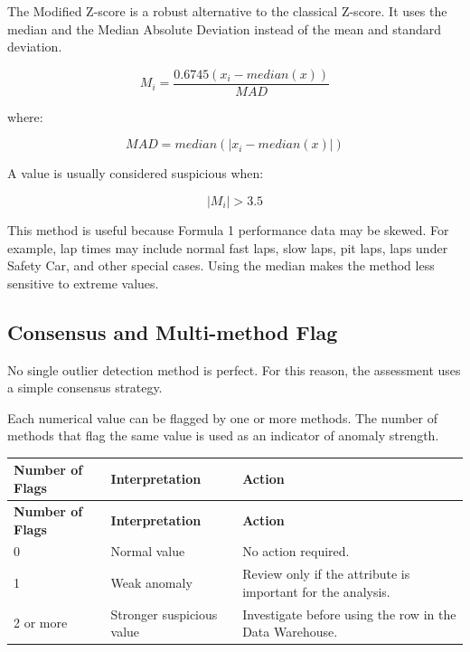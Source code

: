 \documentclass[a4paper,11pt]{article}
\begin{document}
	The Modified Z-score is a robust alternative to the classical Z-score. It uses the median
	and the Median Absolute Deviation instead of the mean and standard deviation.
	
	\[
	M_i = \frac{0.6745(x_i - median(x))}{MAD}
	\]
	
	where:
	
	\[
	MAD = median(|x_i - median(x)|)
	\]
	
	A value is usually considered suspicious when:
	
	\[
	|M_i| > 3.5
	\]
	
	This method is useful because Formula 1 performance data may be skewed. For example,
	lap times may include normal fast laps, slow laps, pit laps, laps under Safety Car, and
	other special cases. Using the median makes the method less sensitive to extreme values.
	
	\subsection{Consensus and Multi-method Flag}
	
	No single outlier detection method is perfect. For this reason, the assessment uses a
	simple consensus strategy.
	
	Each numerical value can be flagged by one or more methods. The number of methods
	that flag the same value is used as an indicator of anomaly strength.
	
	\begin{longtable}{p{3cm}p{5cm}p{6cm}}
		\toprule
		\textbf{Number of Flags} & \textbf{Interpretation} & \textbf{Action} \\
		\midrule
		\endfirsthead
		
		\toprule
		\textbf{Number of Flags} & \textbf{Interpretation} & \textbf{Action} \\
		\midrule
		\endhead
		
		0 &
		Normal value &
		No action required. \\
		\midrule
		
		1 &
		Weak anomaly &
		Review only if the attribute is important for the analysis. \\
		\midrule
		
		2 or more &
		Stronger suspicious value &
		Investigate before using the row in the Data Warehouse. \\
		\bottomrule
	\end{longtable}
	
\end{document}
